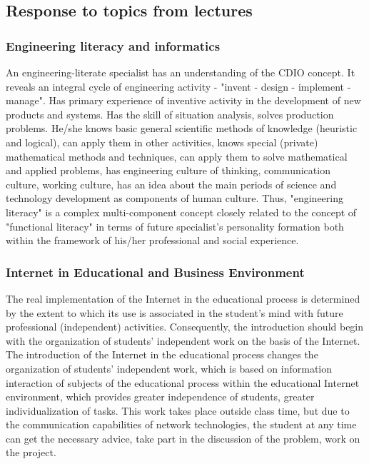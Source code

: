 \documentclass[10pt, twoside, slovak,a4paper]{article}
\begin{document}
\subsection{Response to topics from lectures}
\subsubsection{Engineering literacy and informatics}
An engineering-literate specialist has an understanding of the CDIO concept. It reveals an integral cycle of engineering activity - "invent - design - implement - manage".  Has primary experience of inventive activity in the development of new products and systems. Has the skill of situation analysis, solves production problems. 
He/she knows basic general scientific methods of knowledge (heuristic and logical), can apply them in other activities, knows special (private) mathematical methods and techniques, can apply them to solve mathematical and applied problems, has engineering culture of thinking, communication culture, working culture, has an idea about the main periods of science and technology development as components of human culture.
Thus, "engineering literacy" is a complex multi-component concept closely related to the concept of "functional literacy" in terms of future specialist's personality formation both within the framework of his/her professional and social experience.\\

\subsubsection{Internet in Educational and Business Environment}
The real implementation of the Internet in the educational process is determined by the extent to which its use is associated in the student's mind with future professional (independent) activities. 
Consequently, the introduction should begin with the organization of students' independent work on the basis of the Internet. 
The introduction of the Internet in the educational process changes the organization of students' independent work, which is based on information interaction of subjects of the educational process within the educational Internet environment, which provides greater independence of students, greater individualization of tasks. 
This work takes place outside class time, but due to the communication capabilities of network technologies, the student at any time can get the necessary advice, take part in the discussion of the problem, work on the project.\\ 
\end{document}
